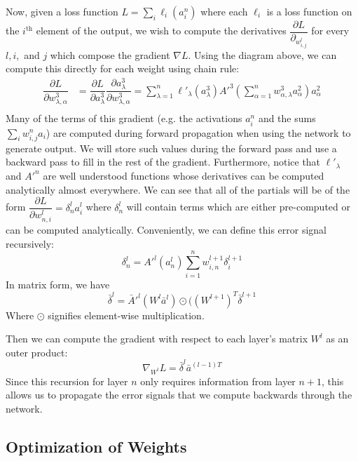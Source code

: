 \documentclass[10pt]{extarticle}
\begin{document}
Now, given a loss function $L = \sum_{i} \ell_i(a^n_i)$ where each $\ell_i$ is a loss function on the $i^{\text{th}}$ element of the output, we wish to compute the derivatives $\dfrac{\partial L}{\partial_{w^l_{i,j}}}$ for every $l, i,$ and $j$ which compose the gradient $\nabla L$. Using the diagram above, we can compute this directly for each weight using chain rule:
\begin{align*}
    \dfrac{\partial L}{\partial w^3_{\lambda,\alpha}} &= \dfrac{\partial L}{\partial a^3_{\lambda}} \dfrac{\partial a^3_{\lambda}}{\partial w^3_{\lambda,\alpha}} = \sum_{\lambda=1}^n \ell'_\lambda( a^3_\lambda) A'^3 (\sum_{\alpha=1}^n w^3_{\alpha, \lambda} a_\alpha^2) a^2_\alpha\\    
\end{align*}
Many of the terms of this gradient (e.g. the activations $a^n_i$ and the sums $\sum_{i} w^n_{i,j} a_i$) are computed during forward propagation when using the network to generate output. 
We will store such values during the forward pass and use a backward pass to fill in the rest of the gradient. Furthermore, notice that $\ell'_\lambda$ and $A'^n$ are well understood functions 
whose derivatives can be computed analytically almost everywhere. We can see that all of the partials will be of the form 
$\dfrac{\partial L}{\partial w^l_{n, i}} = \delta^l_n a^l_i$ where $\delta^l_n$  will contain terms which are either pre-computed or can be computed analytically. Conveniently, we can define this error signal recursively: 
\[
\delta^l_n = A'^l (a^l_{n}) \sum_{i = 1}^n w^{l+1}_{i, n} \delta^{l+1}_i
\]
In matrix form, we have
\[\bar \delta^l = \bar A'^l(W^l \bar a^l) \odot ((W^{l+1})^T \bar \delta^{l+1}\]
Where $\odot$ signifies element-wise multiplication. 

Then we can compute the gradient with respect to each layer's matrix $W^l$ as an outer product: 
\[\nabla_{W^l} L = \bar \delta^l \bar a^{(l-1)T}\]
Since this recursion for layer $n$ only requires information from layer $n+1$, this allows us to propagate the error signals that we compute backwards through the network. 


\subsection{Optimization of Weights}
\end{document}
